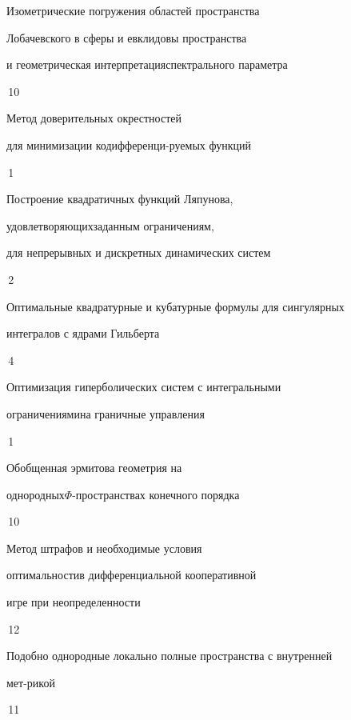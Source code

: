 

{Изометрические погружения областей пространства\newline


Лобачевского в сферы и евклидовы пространства


и геометрическая интерпретация\newline  спектрального параметра}{\No\,10}




{Метод доверительных окрестностей 


для минимизации кодифференци-\newline руемых функций}{\No\,1}




{Построение квадратичных функций Ляпунова,


удовлетворяющих\newline заданным ограничениям,


для непрерывных и дискретных динамических систем}{\No\,2}




{Оптимальные квадратурные и кубатурные формулы для сингулярных\newline


интегралов с ядрами Гильберта}{\No\,4}




{Оптимизация гиперболических систем с интегральными


ограничениями\newline на граничные управления}{\No\,1}










{Обобщенная эрмитова геометрия на


однородных\newline $\Phi$-пространствах конечного порядка}{\No\,10}




{Метод штрафов и необходимые условия  


оптимальности\newline в дифференциальной кооперативной


игре при неопределенности}{\No\,12}




{Подобно однородные локально полные пространства с внутренней


мет-\newline рикой}{\No\,11}


